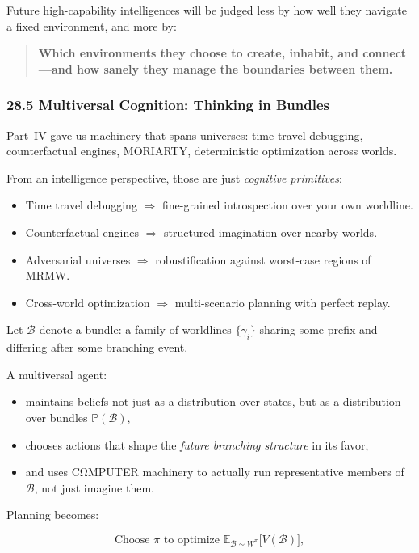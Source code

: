 Future high-capability intelligences will be judged less by how well they navigate
a fixed environment, and more by:

\begin{quote}
\textbf{Which environments they choose to create, inhabit, and connect—and how sanely they manage the boundaries between them.}
\end{quote}

\subsubsection*{28.5  Multiversal Cognition: Thinking in Bundles}

Part~IV gave us machinery that spans universes: time-travel debugging, counterfactual engines, MORIARTY, deterministic optimization across worlds.

From an intelligence perspective, those are just \emph{cognitive primitives}:

\begin{itemize}
  \item Time travel debugging $\Rightarrow$ fine-grained introspection over your own worldline.
  \item Counterfactual engines $\Rightarrow$ structured imagination over nearby worlds.
  \item Adversarial universes $\Rightarrow$ robustification against worst-case regions of MRMW.
  \item Cross-world optimization $\Rightarrow$ multi-scenario planning with perfect replay.
\end{itemize}

Let $\mathcal{B}$ denote a bundle: a family of worldlines $\{\gamma_i\}$ sharing some prefix and differing after some branching event.

A multiversal agent:

\begin{itemize}
  \item maintains beliefs not just as a distribution over states, but as a distribution over bundles $\mathbb{P}(\mathcal{B})$,
  \item chooses actions that shape the \emph{future branching structure} in its favor,
  \item and uses CΩMPUTER machinery to actually run representative members of $\mathcal{B}$, not just imagine them.
\end{itemize}

Planning becomes:

\[
  \text{Choose } \pi \text{ to optimize } \mathbb{E}_{\mathcal{B} \sim W^\pi}\big[ V(\mathcal{B}) \big],
\]


